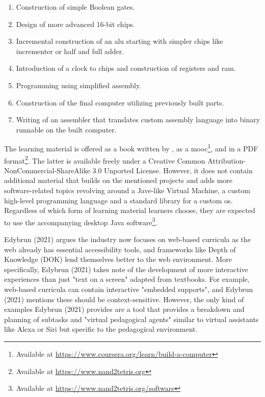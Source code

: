 \begin{enumerate}
    \item Construction of simple Boolean gates.
    \item Design of more advanced 16-bit chips.
    \item Incremental construction of an \gls{alu} starting with simpler chips like incrementer or half and full adder.
    \item Introduction of a clock to chips and construction of registers and \gls{ram}.
    \item Programming using simplified assembly.
    \item Construction of the final computer utilizing previously built parts.
    \item Writing of an assembler that translates custom assembly language into binary runnable on the built computer.
\end{enumerate}

The learning material is offered as a book written by \textcite{nand2tetris}, as a \gls{mooc}\footnote{Available at \url{https://www.coursera.org/learn/build-a-computer}}, and in a PDF format\footnote{Available at \url{https://www.nand2tetris.org}}.
The latter is available freely under a Creative Common Attribution-NonCommercial-ShareAlike 3.0 Unported License.
However, it does not contain additional material that builds on the mentioned projects and adds more software-related topics revolving around a Jave-like Virtual Machine, a custom high-level programming language and a standard library for a custom \gls{os}.
Regardless of which form of learning material learners choose, they are expected to use the accompanying desktop Java software\footnote{Available at \url{https://www.nand2tetris.org/software}}.

Edybrun (2021) argues the industry now focuses on web-based curricula as the web already has essential accessibility tools, and frameworks like Depth of Knowledge (DOK) lend themselves better to the web environment.
More specifically, Edybrun (2021) takes note of the development of more interactive experiences than just "text on a screen" adapted from textbooks.
For example, web-based curricula can contain interactive "embedded supports", and Edybrun (2021) mentions these should be context-sensitive.
However, the only kind of examples Edybrun (2021) provides are a tool that provides a breakdown and planning of subtasks and "virtual pedagogical agents" similar to virtual assistants like Alexa or Siri but specific to the pedagogical environment.

